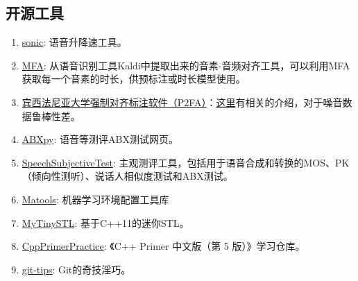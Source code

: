 \documentclass[cn,10pt,math=newtx,citestyle=gb7714-2015,bibstyle=gb7714-2015]{elegantbook}
\begin{document}
\subsection{开源工具}
\begin{enumerate}
  \item \href{https://github.com/waywardgeek/sonic}{sonic}: 语音升降速工具。
  \item \href{https://github.com/MontrealCorpusTools/Montreal-Forced-Aligner/releases/download/v1.0.1/montreal-forced-aligner_linux.tar.gz}{MFA}: 从语音识别工具Kaldi中提取出来的音素-音频对齐工具，可以利用MFA获取每一个音素的时长，供预标注或时长模型使用。
  \item \href{https://github.com/jaekookang/p2fa_py3}{宾西法尼亚大学强制对齐标注软件（P2FA）}：\href{https://blog.csdn.net/jojozhangju/article/details/51951622}{这里}有相关的介绍，对于噪音数据鲁棒性差。
  \item \href{https://github.com/bootphon/ABXpy}{ABXpy}: 语音等测评ABX测试网页。
  \item \href{https://github.com/bigpon/SpeechSubjectiveTest}{SpeechSubjectiveTest}: 主观测评工具，包括用于语音合成和转换的MOS、PK（倾向性测听）、说话人相似度测试和ABX测试。
  \item \href{https://github.com/matpool/matools}{Matools}: 机器学习环境配置工具库
  \item \href{https://github.com/Alinshans/MyTinySTL}{MyTinySTL}: 基于C++11的迷你STL。
  \item \href{https://github.com/applenob/Cpp_Primer_Practice}{CppPrimerPractice}: 《C++ Primer 中文版（第 5 版）》学习仓库。
  \item \href{https://github.com/521xueweihan/git-tips}{git-tips}: Git的奇技淫巧。
\end{enumerate}
\end{document}
